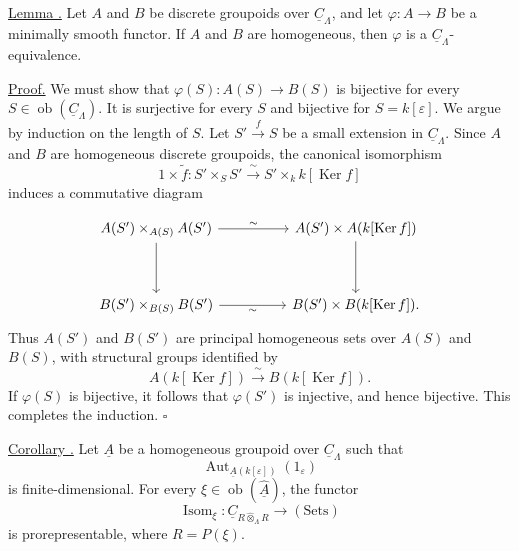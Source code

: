 \underline{Lemma .} Let $A$ and $B$ be discrete groupoids over
$\underline C_\Lambda$, and let $\varphi:A\longrightarrow B$ be a
minimally smooth functor. If $A$ and $B$ are homogeneous, then
$\varphi$ is a $\underline C_\Lambda$-equivalence.

\underline{Proof.} We must show that
$\varphi(S):A(S)\longrightarrow B(S)$ is bijective for every
$S\in\operatorname{ob}(\underline C_\Lambda)$. It is surjective for
every $S$ and bijective for $S=k[\varepsilon]$. We argue by induction
on the length of $S$. Let $S'\xrightarrow fS$ be a small extension
in $\underline C_\Lambda$. Since $A$ and $B$ are homogeneous
discrete groupoids, the canonical isomorphism
\[
 1\times\widetilde f:S'\times_SS'
 \xrightarrow{\ \sim\ }S'\times_k k[\operatorname{Ker}f]
\]
induces a commutative diagram


\[
\begin{tikzcd}[column sep=huge,row sep=huge]
 A(S')\times_{A(S)}A(S') \arrow[r,"\sim"] \arrow[d]
 & A(S')\times A(k[\operatorname{Ker}f]) \arrow[d]\\
 B(S')\times_{B(S)}B(S') \arrow[r,"\sim"']
 & B(S')\times B(k[\operatorname{Ker}f]).
\end{tikzcd}
\]
Thus $A(S')$ and $B(S')$ are principal homogeneous sets over $A(S)$
and $B(S)$, with structural groups identified by
\[
 A(k[\operatorname{Ker}f])\xrightarrow{\ \sim\ }
 B(k[\operatorname{Ker}f]).
\]
If $\varphi(S)$ is bijective, it follows that $\varphi(S')$ is
injective, and hence bijective. This completes the induction.
\hfill$\square$

\underline{Corollary .} Let $\underline A$ be a homogeneous
groupoid over $\underline C_\Lambda$ such that
\[
 \operatorname{Aut}_{\underline A(k[\varepsilon])}(1_\varepsilon)
\]
is finite-dimensional. For every
$\xi\in\operatorname{ob}(\widehat{\underline A})$, the functor
\[
 \operatorname{Isom}_\xi:
 \underline C_{R\widehat\otimes_\Lambda R}
 \longrightarrow(\mathrm{Sets})
\]
is prorepresentable, where $R=P(\xi)$.

